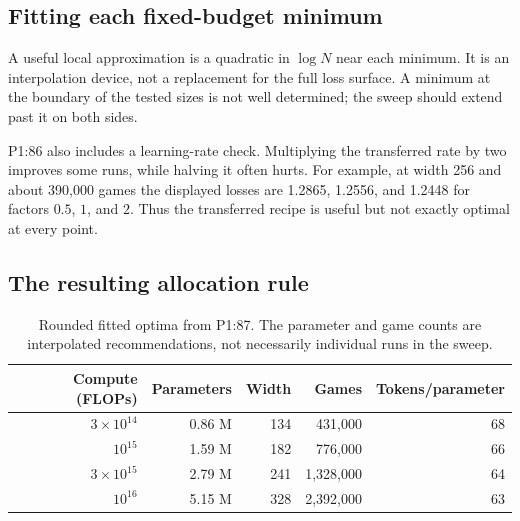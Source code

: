 \subsection{Fitting each fixed-budget minimum}

A useful local approximation is a quadratic in $\log N$ near each minimum. It is an interpolation device, not a replacement for the full loss surface. A minimum at the boundary of the tested sizes is not well determined; the sweep should extend past it on both sides.

P1:86 also includes a learning-rate check. Multiplying the transferred rate by two improves some runs, while halving it often hurts. For example, at width 256 and about 390,000 games the displayed losses are 1.2865, 1.2556, and 1.2448 for factors $0.5$, $1$, and $2$. Thus the transferred recipe is useful but not exactly optimal at every point.


\subsection{The resulting allocation rule}

\begin{table}[htbp]
\centering\small
\begin{tabular}{rrrrr}
\toprule
Compute (FLOPs)&Parameters&Width&Games&Tokens/parameter\\
\midrule
$3\times10^{14}$&0.86 M&134&431,000&68\\
$10^{15}$&1.59 M&182&776,000&66\\
$3\times10^{15}$&2.79 M&241&1,328,000&64\\
$10^{16}$&5.15 M&328&2,392,000&63\\
\bottomrule
\end{tabular}
\caption{Rounded fitted optima from P1:87. The parameter and game counts are interpolated recommendations, not necessarily individual runs in the sweep.}
\end{table}

